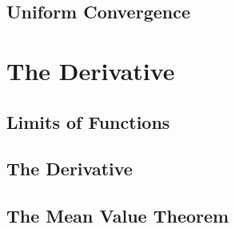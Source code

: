 \documentclass[12pt]{book}
\newenvironment{exercise}[2][Exercise]{\begin{trivlist}
\item[\hskip \labelsep {\bfseries #1}\hskip \labelsep {\bfseries #2.}]}{\end{trivlist}}
\begin{document}
\section{Uniform Convergence}



\chapter{The Derivative}
\section{Limits of Functions}



\section{The Derivative}



\section{The Mean Value Theorem}

\begin{exercise}{4.3.1}
\end{exercise}


\begin{exercise}{4.3.2}
\end{exercise}

\begin{exercise}{4.3.3}
\end{exercise}

\begin{exercise}{4.3.4}
\end{exercise}

\begin{exercise}{4.3.5}
\end{exercise}

\begin{exercise}{4.3.6}
\end{exercise}

\begin{exercise}{4.3.7}
\end{exercise}
\end{document}
